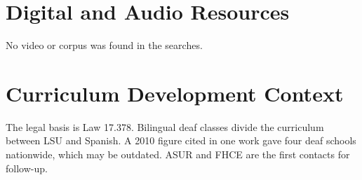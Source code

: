\documentclass[12pt]{article}
\begin{document}
\section{Digital and Audio Resources}
No video or corpus was found in the searches.

\section{Curriculum Development Context}
The legal basis is Law 17.378. Bilingual deaf classes divide the curriculum between LSU and Spanish. A 2010 figure cited in one work gave four deaf schools nationwide, which may be outdated. ASUR and FHCE are the first contacts for follow-up.
\end{document}
